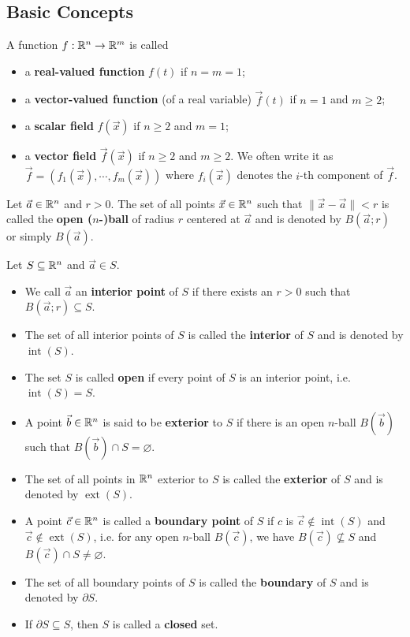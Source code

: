 \documentclass[a4paper]{ctexart}
\begin{document}
    \subsection{Basic Concepts}
    \begin{mydef}
        A function $f: \mathbb{R}^n \to \mathbb{R}^m$ is called
        \begin{itemize}
            \item a \textbf{real-valued function} $f(t)$ if $n=m=1$;
            \item a \textbf{vector-valued function} (of a real variable) $\vec f (t)$ if $n=1$ and $m\ge 2$;
            \item a \textbf{scalar field} $f(\vec x)$ if $n\ge 2$ and $m=1$;
            \item a \textbf{vector field} $\vec f (\vec x)$ if $n\ge 2$ and $m\ge 2$. We often write it as $\vec f = (f_1(\vec x), \cdots, f_m(\vec x))$ where $f_i(\vec x)$ denotes the $i$-th component of $\vec f$.
        \end{itemize}
    \end{mydef}
    \begin{mydef}
        Let $\vec a \in \mathbb{R}^n$ and $r>0$. The set of all points $\vec x\in \mathbb{R}^n$ such that $\| \vec x - \vec a\| < r$ is called the \textbf{open ($n$-)ball} of radius $r$ centered at $\vec a$ and is denoted by $B(\vec a; r)$ or simply $B(\vec a)$.
    \end{mydef}
    \begin{mydef}
        Let $S\subseteq \mathbb{R}^n$ and $\vec a \in S$.
        \begin{itemize}
            \item We call $\vec a $ an \textbf{interior point} of $S$ if there exists an $r>0$ such that $B(\vec a; r) \subseteq S$.
            \item The set of all interior points of $S$ is called the \textbf{interior} of $S$ and is denoted by $\operatorname{int}(S)$.
            \item The set $S$ is called \textbf{open} if every point of $S$ is an interior point, i.e. $\operatorname{int}(S) = S$.
            \item A point $\vec b\in \mathbb{R}^n$ is said to be \textbf{exterior} to $S$ if there is an open $n$-ball $B(\vec b)$ such that $B(\vec b) \cap S = \varnothing$.
            \item The set of all points in $\mathbb{R}^n$ exterior to $S$ is called the \textbf{exterior} of $S$ and is denoted by $\operatorname{ext}(S)$.
            \item A point $\vec c\in \mathbb{R}^n$ is called a \textbf{boundary point} of $S$ if $c$ is $\vec c \notin \operatorname{int}(S)$ and $\vec c \notin \operatorname{ext}(S)$, i.e. for any open $n$-ball $B(\vec c)$, we have $B(\vec c) \nsubseteq S$ and $B(\vec c) \cap S \ne \varnothing$.
            \item The set of all boundary points of $S$ is called the \textbf{boundary} of $S$ and is denoted by $\partial S$.
            \item If $\partial S \subseteq S$, then $S$ is called a \textbf{closed} set.
        \end{itemize}
    \end{mydef}
\end{document}
